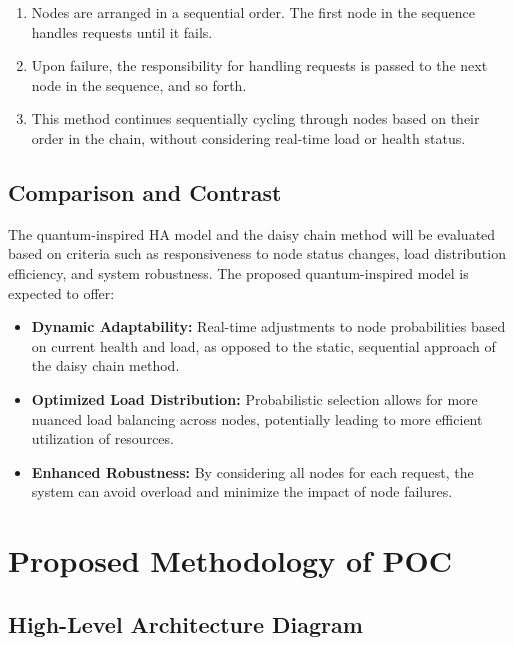 \documentclass[12pt]{article}
\begin{document}
\begin{enumerate}
    \item Nodes are arranged in a sequential order. The first node in the sequence handles requests until it fails.
    \item Upon failure, the responsibility for handling requests is passed to the next node in the sequence, and so forth.
    \item This method continues sequentially cycling through nodes based on their order in the chain, without considering real-time load or health status.
\end{enumerate}

\subsection{Comparison and Contrast}
The quantum-inspired HA model and the daisy chain method will be evaluated based on criteria such as responsiveness to node status changes, load distribution efficiency, and system robustness. The proposed quantum-inspired model is expected to offer:

\begin{itemize}
    \item \textbf{Dynamic Adaptability:} Real-time adjustments to node probabilities based on current health and load, as opposed to the static, sequential approach of the daisy chain method.
    \item \textbf{Optimized Load Distribution:} Probabilistic selection allows for more nuanced load balancing across nodes, potentially leading to more efficient utilization of resources.
    \item \textbf{Enhanced Robustness:} By considering all nodes for each request, the system can avoid overload and minimize the impact of node failures.
\end{itemize}
\newpage
\section{Proposed Methodology of POC}

\subsection{High-Level Architecture Diagram}
\end{document}
